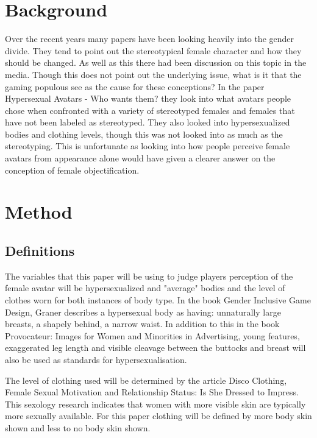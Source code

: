 \documentclass{scrartcl}
\begin{document}
\section{Background}

Over the recent years many papers have been looking heavily into the gender divide. They tend to point out the stereotypical female character and how they should be changed\cite{LaraPhenomenon,MirrorSexist,GenderSteriotype}. As well as this there had been discussion on this topic in the media\cite{SexualisationSTOP,LetsTalk}. Though this does not point out the underlying issue, what is it that the gaming populous see as the cause for these conceptions? In the paper Hypersexual Avatars - Who wants them?\cite{WhowantsThem} they look into what avatars people chose when confronted with a variety of stereotyped females and females that have not been labeled as stereotyped. They also looked into hypersexualized bodies and clothing levels, though this was not looked into as much as the stereotyping. This is unfortunate as looking into how people perceive female avatars from appearance alone would have given a clearer answer on the conception of female objectification. 

\section{Method}

\subsection{Definitions}

The variables that this paper will be using to judge players perception of the female avatar will be hypersexualized and "average" bodies and the level of clothes worn for both instances of body type.
\newline
In the book Gender Inclusive Game Design\cite{Graner}, Graner describes a hypersexual body as having: unnaturally large breasts, a shapely behind, a narrow waist. In addition to this in the book Provocateur: Images for Women and Minorities in Advertising\cite{WomenAds}, young features, exaggerated leg length and visible cleavage between the buttocks and breast will also be used as standards for hypersexualisation.

The level of clothing used will be determined by the article Disco Clothing, Female Sexual Motivation and Relationship Status: Is She Dressed to Impress\cite{SkinExpose}. This sexology research indicates that women with more visible skin are typically more sexually available. For this paper clothing will be defined by more body skin shown and less to no body skin shown.
\end{document}
